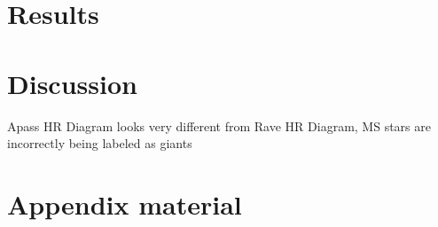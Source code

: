 \documentclass[iop]{emulateapj}
\begin{document}
\section{Results}

\section{Discussion}
Apass HR Diagram looks very different from Rave HR Diagram, MS stars are incorrectly being labeled as giants

\acknowledgments


\appendix

\section{Appendix material}


\begin{thebibliography}{}
\end{thebibliography}

\clearpage
\end{document}
